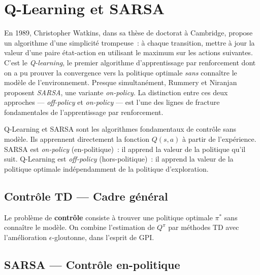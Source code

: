 \chapter{Q-Learning et SARSA}
\label{ch:q_learning}

En 1989, Christopher Watkins, dans sa th\`ese de doctorat \`a Cambridge, propose un algorithme d'une simplicit\'e trompeuse~: \`a chaque transition, mettre \`a jour la valeur d'une paire \'etat-action en utilisant le maximum sur les actions suivantes. C'est le \emph{Q-learning}, le premier algorithme d'apprentissage par renforcement dont on a pu prouver la convergence vers la politique optimale \emph{sans} conna\^itre le mod\`ele de l'environnement. Presque simultan\'ement, Rummery et Niranjan proposent \emph{SARSA}, une variante \emph{on-policy}. La distinction entre ces deux approches --- \emph{off-policy} et \emph{on-policy} --- est l'une des lignes de fracture fondamentales de l'apprentissage par renforcement.

\begin{intuition}
Q-Learning et SARSA sont les algorithmes fondamentaux de contr\^ole sans mod\`ele.
Ils apprennent directement la fonction $Q(s,a)$ \`a partir de l'exp\'erience.
SARSA est \emph{on-policy} (en-politique)~: il apprend la valeur de la politique
qu'il suit. Q-Learning est \emph{off-policy} (hors-politique)~: il apprend la
valeur de la politique optimale ind\'ependamment de la politique d'exploration.
\end{intuition}

\section{Contr\^ole TD --- Cadre g\'en\'eral}

Le probl\`eme de \textbf{contr\^ole} consiste \`a trouver une politique optimale
$\pi^*$ sans conna\^itre le mod\`ele. On combine l'estimation de $Q^\pi$ par
m\'ethodes TD avec l'am\'elioration $\epsilon$-gloutonne, dans l'esprit de GPI.

\section{SARSA --- Contr\^ole en-politique}

